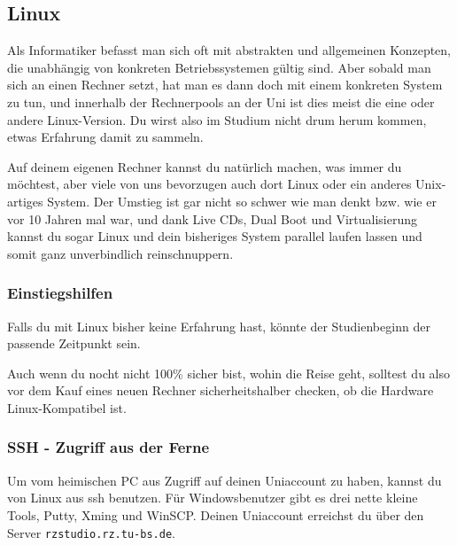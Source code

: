 \subsection{Linux}
	\label{linux}
	Als Informatiker befasst man sich oft mit abstrakten und allgemeinen Konzepten, die unabhängig von konkreten Betriebssystemen gültig sind. Aber sobald man sich an einen Rechner setzt, hat man es dann doch mit einem konkreten System zu tun, und innerhalb der Rechnerpools an der Uni ist dies meist die eine oder andere Linux-Version. Du wirst also im Studium nicht drum herum kommen, etwas Erfahrung damit zu sammeln.

	Auf deinem eigenen Rechner kannst du natürlich machen, was immer du möchtest, aber viele von uns bevorzugen auch dort Linux oder ein anderes Unix-artiges System. Der Umstieg ist gar nicht so schwer wie man denkt bzw. wie er vor 10 Jahren mal war, und dank Live CDs, Dual Boot und Virtualisierung kannst du sogar Linux und dein bisheriges System parallel laufen lassen und somit ganz unverbindlich reinschnuppern.

	\subsubsection{Einstiegshilfen}
		Falls du mit Linux bisher keine Erfahrung hast, könnte der Studienbeginn der passende Zeitpunkt sein. 
		

		Auch wenn du nocht nicht 100\% sicher bist, wohin die Reise geht, solltest du also vor dem Kauf eines neuen Rechner sicherheitshalber checken, ob die Hardware Linux-Kompatibel ist.

	\subsubsection{SSH - Zugriff aus der Ferne}
		Um vom heimischen PC aus Zugriff auf deinen Uniaccount
		zu haben, kannst du von Linux aus ssh benutzen. Für
		Windowsbenutzer gibt es drei nette kleine Tools, Putty,
		Xming und WinSCP. Deinen Uniaccount erreichst du über den Server \texttt{rzstudio.rz.tu-bs.de}.

